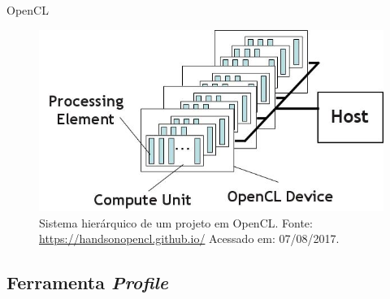      \begin{frame}{OpenCL} \vspace{-1em}
         \begin{figure}[h] \centering
         \includegraphics[width=1\textwidth]{img/opencl.jpg}
         \caption{Sistema hierárquico de um projeto em OpenCL. Fonte: \url{https://handsonopencl.github.io/} Acessado em: 07/08/2017.}
         \label{fig:opencl}
         \end{figure}
      \end{frame}


   
   \subsection{Ferramenta {\it Profile}}

